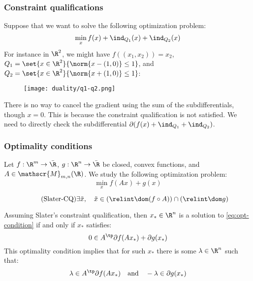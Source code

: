 \subsubsection{Constraint qualifications}
Suppose that we want to solve the following optimization problem:
\begin{equation*}
    \min_x f(x) + \ind_{Q_1}(x) + \ind_{Q_2}(x)
\end{equation*}
For instance in $\R^2$, we might have $f((x_1, x_2))=x_2$, $Q_1=\set{x\in\R^2}{\norm{x-(1, 0)}\leq 1}$, and $Q_2=\set{x\in\R^2}{\norm{x+(1, 0)}\leq 1}$:
\begin{figure}[H]
    \centering
    \texttt{[image: duality/q1-q2.png]}
\end{figure}
There is no way to cancel the gradient using the sum of the subdifferentials, though $x=0$. This is because the constraint qualification is not satisfied. We need to directly check the subdifferential $\partial (f(x) + \ind_{Q_1} + \ind_{Q_2})$.

\subsubsection{Optimality conditions}
Let $f:\R^m\to\bar{\R}$, $g:\R^n\to\bar{\R}$ be closed, convex functions, and $A\in\mathscr{M}_{m, n}(\R)$. We study the following optimization problem:
\begin{equation}
    \label{eq:opt-condition}
    \min_x f(Ax)+g(x)
\end{equation}

\begin{theorem}
    \begin{equation}
        \label{eq:slater-cq}
        \tag{Slater-CQ}
        \exists \tilde{x}, \quad \tilde{x}\in(\relint\dom (f\circ A)) \cap(\relint\dom g)
    \end{equation}
\end{theorem}

Assuming Slater's constraint qualification, then $x_*\in\R^n$ is a solution to \autoref{eq:opt-condition} if and only if $x_*$ satisfies:
\begin{equation*}
    0\in A^\tp\partial f(Ax_*) + \partial g(x_*)
\end{equation*}
This optimality condition implies that for such $x_*$ there is some $\lambda\in\R^n$ such that:
\begin{equation*}
    \lambda\in A^\tp\partial f(Ax_*) \quad\text{and}\quad -\lambda\in\partial g(x_*)
\end{equation*}

